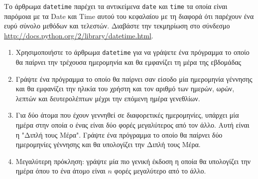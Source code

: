 \documentclass[10pt]{book}
\begin{document}




\begin{exercise}

Το άρθρωμα {\tt datetime} παρέχει τα αντικείμενα {\tt date} και {\tt time} τα οποία είναι παρόμοια με τα Date
και Time αυτού του κεφαλαίου με τη διαφορά ότι παρέχουν ένα ευρύ σύνολο μεθόδων και τελεστών. Διαβάστε την
τεκμηρίωση στο σύνδεσμο \url{http://docs.python.org/2/library/datetime.html}. 

\begin{enumerate}

\item Χρησιμοποιήστε το άρθρωμα {\tt datetime} για να γράψετε ένα πρόγραμμα το
  οποίο θα παίρνει την τρέχουσα ημερομηνία και θα εμφανίζει τη μέρα της εβδομάδας

\item Γράψτε ένα πρόγραμμα το οποίο θα παίρνει σαν είσοδο μία ημερομηνία γέννησης
  και θα εμφανίζει την ηλικία του χρήστη και τον αριθμό των ημερών, ωρών, λεπτών και
  δευτερολέπτων μέχρι την επόμενη ημέρα γενεθλίων.

\item Για δύο άτομα που έχουν γεννηθεί σε διαφορετικές ημερομηνίες, υπάρχει μία ημέρα στην
  οποία ο ένας είναι δύο φορές μεγαλύτερος από τον άλλο. Αυτή είναι η "Διπλή τους
  Μέρα". Γράψτε ένα πρόγραμμα το οποίο θα παίρνει δύο ημερομηνίες γέννησης και θα
  υπολογίζει την Διπλή τους Μέρα.

\item Μεγαλύτερη πρόκληση: γράψτε μία πιο γενική έκδοση η οποία θα υπολογίζει την
  ημέρα όπου το ένα άτομο είναι $n$ φορές μεγαλύτερο από το άλλο.

\end{enumerate}

\end{exercise}
\end{document}
